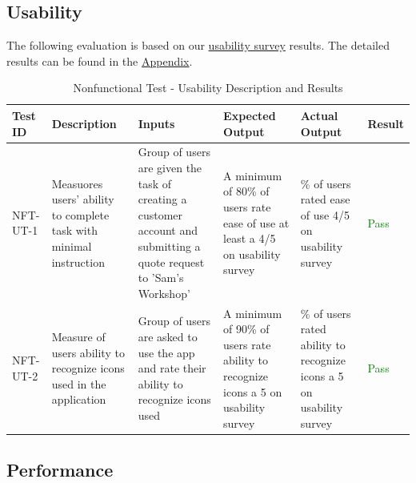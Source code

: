 \documentclass[12pt, titlepage]{article}
\begin{document}
\subsection{Usability}

The following evaluation is based on our \href{https://forms.gle/GUkhZDEA7SVjYAVi8}{usability survey} results. The detailed results can be found in the \hyperref[sec:AppSurveyResults]{Appendix}.

\renewcommand{\arraystretch}{1.8}%
\begin{longtable}{| m{.1\linewidth} |>{\raggedright\arraybackslash} m{.14\linewidth} |>{\raggedright\arraybackslash} m{.19\linewidth}|>{\raggedright\arraybackslash} m{.21\linewidth} |>{\raggedright\arraybackslash} m{.19\linewidth}|>{\centering\arraybackslash} m{.08\linewidth}|}
\caption{Nonfunctional Test - Usability Description and Results}
\label{tab:UsabilityTestResults}
\\ \hline
\textbf{Test ID} & \textbf{Description} & \textbf{Inputs} & \textbf{Expected Output} & \textbf{Actual Output} & \textbf{Result} \\
\hline
\endfirsthead
\endfoot
\endlastfoot
NFT-UT-1 & Measuores users' ability to complete task with minimal instruction & Group of users are given the task of creating a customer account and submitting a quote request to 'Sam's Workshop' & A minimum of 80\% of users rate ease of use at least a 4/5 on usability survey & 81.8\% of users rated ease of use 4/5 on usability survey & \textcolor{Green}{Pass} \\
\hline
NFT-UT-2 & Measure of users ability to recognize icons used in the application & Group of users are asked to use the app and rate their ability to recognize icons used & A minimum of 90\% of users rate ability to recognize icons a 5 on usability survey & 100\% of users rated ability to recognize icons a 5 on usability survey & \textcolor{Green}{Pass} \\
\hline
\end{longtable}

\newpage
\subsection{Performance}
\end{document}
